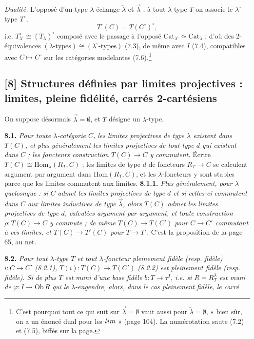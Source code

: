 \documentclass[11pt,a4paper]{article}
\begin{document}
\emph{Dualité.} L'opposé d'un type $\lambda$ échange $\overleftarrow{\lambda}$
et $\overrightarrow{\lambda}$ ; à tout $\lambda$-type $T$ on associe le
$\lambda^{\circ}$-type $T^{\circ}$,
\begin{equation}
T^{\circ}(C) = T(C^{\circ})^{\circ}, \tag{7.1}
\end{equation}
i.e. $T^{\circ}_{\lambda^{\circ}} \cong (T_{\lambda})^{\circ}$ composé avec
le passage à l'opposé $\mathrm{Cat}_{\lambda^{\circ}} \simeq \mathrm{Cat}_{
\lambda}$ ; d'où des 2-équivalences $(\lambda\text{-types}) \cong
(\lambda^{\circ}\text{-types})$ (7.3), de même avec $I$ (7.4), compatibles
avec $C \mapsto C^{\circ}$ sur les catégories modelantes
(7.6).\footnote{C'est pourquoi tout ce qui suit sur $\overrightarrow{\lambda}
= \emptyset$ vaut aussi pour $\overleftarrow{\lambda} = \emptyset$, « bien
sûr, on a un énoncé dual pour les $\varinjlim$ » (page 104). La
numérotation saute (7.2) et (7.5), biffés sur la page.}

\subsection*{[8] Structures définies par limites projectives : limites, pleine fidélité, carrés 2-cartésiens}

On suppose désormais $\overrightarrow{\lambda} = \emptyset$, et $T$
désigne un $\lambda$-type.

\textbf{8.1.} \emph{Pour toute $\lambda$-catégorie $C$, les limites
projectives de type $\lambda$ existent dans $T(C)$, et plus généralement
les limites projectives de tout type $d$ qui existent dans $C$ ; les
foncteurs construction $T(C) \to C$ y commutent.} Écrire $T(C) \cong
\mathrm{Hom}_{\lambda}(R_{T}, C)$ ; les limites de type $d$ de foncteurs $R_{T}
\to C$ se calculent argument par argument dans $\mathrm{Hom}(R_{T}, C)$, et
les $\lambda$-foncteurs y sont stables parce que les limites commutent aux
limites. \textbf{8.1.1.} \emph{Plus généralement, pour $\lambda$ quelconque :
si $C$ admet les limites projectives de type $d$ et si celles-ci
commutent dans $C$ aux limites inductives de type $\overrightarrow{\lambda}$,
alors $T(C)$ admet les limites projectives de type $d$, calculées argument
par argument, et toute construction $\rho : T(C) \to C$ y commute ; de
même $T(C) \to T(C')$ pour $C \to C'$ commutant à ces limites, et $T(C) \to
T'(C)$ pour $T \to T'$.} C'est la proposition de la page 65, au net.

\textbf{8.2.} \emph{Pour tout $\lambda$-type $T$ et tout $\lambda$-foncteur
pleinement fidèle (resp. fidèle) $i : C \to C'$ (8.2.1), $T(i) : T(C) \to
T(C')$ (8.2.2) est pleinement fidèle (resp. fidèle). Si de plus $T$ est
muni d'une base fidèle $b : T \to \tau^{I}$, i.e. si $R = R^{\lambda}_{T}$ est
muni de $\varphi : I \to \mathrm{Ob}\,R$ qui le $\lambda$-engendre, alors,
dans le cas pleinement fidèle, le carré}
\end{document}
